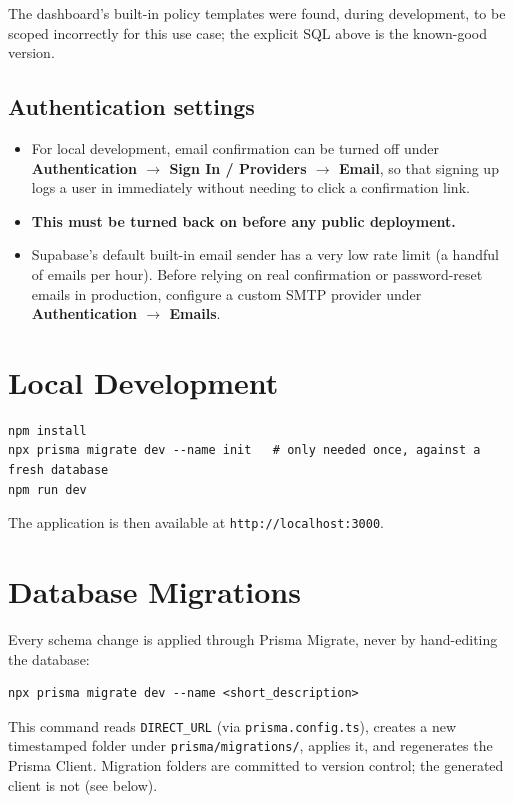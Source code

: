 \documentclass[11pt,a4paper]{article}
\begin{document}
The dashboard's built-in policy templates were found, during development, to be scoped
incorrectly for this use case; the explicit SQL above is the known-good version.

\subsection{Authentication settings}
\begin{itemize}[leftmargin=*]
  \item For local development, email confirmation can be turned off under
        \textbf{Authentication $\to$ Sign In / Providers $\to$ Email}, so that signing
        up logs a user in immediately without needing to click a confirmation link.
  \item \textbf{This must be turned back on before any public deployment.}
  \item Supabase's default built-in email sender has a very low rate limit (a handful
        of emails per hour). Before relying on real confirmation or password-reset
        emails in production, configure a custom SMTP provider under
        \textbf{Authentication $\to$ Emails}.
\end{itemize}

\section{Local Development}
\begin{lstlisting}
npm install
npx prisma migrate dev --name init   # only needed once, against a fresh database
npm run dev
\end{lstlisting}
The application is then available at \texttt{http://localhost:3000}.

\section{Database Migrations}
Every schema change is applied through Prisma Migrate, never by hand-editing the
database:
\begin{lstlisting}
npx prisma migrate dev --name <short_description>
\end{lstlisting}
This command reads \texttt{DIRECT\_URL} (via \texttt{prisma.config.ts}), creates a new
timestamped folder under \texttt{prisma/migrations/}, applies it, and regenerates the
Prisma Client. Migration folders are committed to version control; the generated
client is not (see below).
\end{document}
